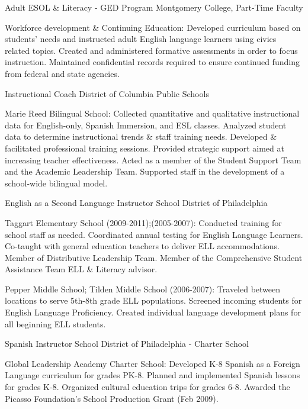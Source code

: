 \documentclass[]{scrartcl}
\begin{document}
\begin{cleanCV}
{Adult ESOL \& Literacy - GED Program}
{Montgomery College, Part-Time Faculty}

\JobDesc
{Workforce development \& Continuing Education: }
{Developed curriculum based on students' needs and instructed adult English language learners using civics related topics. Created and administered formative assessments in order to focus instruction. Maintained confidential records required to ensure continued funding from federal and state agencies.}

\newpage

{Instructional Coach}
{District of Columbia Public Schools}

\JobDesc
{Marie Reed Bilingual School: }
{Collected quantitative and qualitative instructional data for English-only, Spanish Immersion, and ESL classes. Analyzed student data to determine instructional trends \& staff training needs. Developed \& facilitated professional training sessions. Provided strategic support aimed at increasing teacher effectiveness. Acted as a member of the  Student Support Team and the Academic Leadership Team. Supported staff in the development of a school-wide bilingual model.}


{English as a Second Language Instructor}
{School District of Philadelphia}

\JobDesc
{Taggart Elementary School (2009-2011);(2005-2007): }
{Conducted training for school staff as needed. Coordinated annual testing for English Language Learners. Co-taught with general education teachers to deliver ELL accommodations. Member of Distributive Leadership Team. Member of the Comprehensive Student Assistance Team ELL \& Literacy advisor.}

\JobDesc
{Pepper Middle School; Tilden Middle School (2006-2007): }
{Traveled between locations to serve 5th-8th grade ELL populations. 
Screened incoming students for English Language Proficiency.
Created individual language development plans for all beginning ELL students.}

  
{Spanish Instructor}
{School District of Philadelphia - Charter School}

\JobDesc
{Global Leadership Academy Charter School: }
{Developed K-8 Spanish as a Foreign Language curriculum for grades PK-8.
Planned and implemented Spanish lessons for grades K-8.
Organized cultural education trips for grades 6-8. 
Awarded the Picasso Foundation's School Production Grant (Feb 2009).}


\end{cleanCV}
\end{document}

